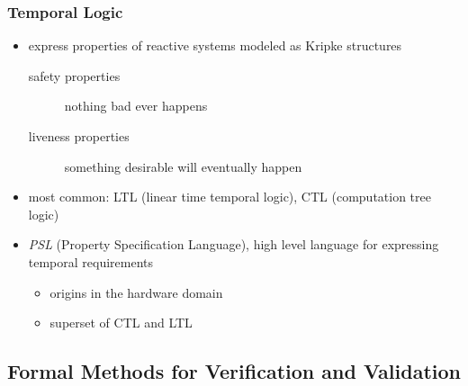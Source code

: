 \documentclass[a4paper, 10pt]{article}
\begin{document}
\subsubsection*{Temporal Logic}
\begin{itemize}
    \item express properties of reactive systems modeled as Kripke structures
    \begin{description}
        \item[safety properties] nothing bad ever happens
        \item[liveness properties] something desirable will eventually happen
    \end{description}
    \item most common: LTL (linear time temporal logic), CTL (computation tree logic)
    \item \emph{PSL} (Property Specification Language), high level language for expressing temporal requirements
    \begin{itemize}
        \item origins in the hardware domain
        \item superset of CTL and LTL
    \end{itemize}
\end{itemize}

\subsection*{Formal Methods for Verification and Validation}
\end{document}
